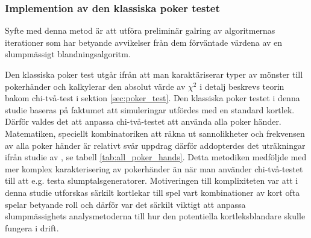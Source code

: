 \documentclass[swedish,a4paper]{article}
\begin{document}






\subsubsection{Implemention av den klassiska poker testet}
Syfte med denna metod är att utföra preliminär galring av algoritmernas
iterationer som har betyande avvikelser från dem förväntade värdena av en slumpmässigt
blandningsalgoritm.  

Den klassiska poker test utgår ifrån att man karaktäriserar typer av mönster
till pokerhänder och kalkylerar  den absolut värde av $\chi^2$ i detalj beskrevs
teorin bakom chi-två-test  i sektion \ref{sec:poker_test}. Den klassiska poker
testet i denna studie baseras på faktumet att simuleringar utfördes med en
standard kortlek. Därför valdes det att anpassa chi-två-testet att använda alla
poker händer. Matematiken, speciellt kombinatoriken att räkna ut sannolikheter
och frekvensen av alla poker\- händer är relativt svår uppdrag därför
addopterdes det uträkningar ifrån studie av \textcite{Drew2006}, se tabell
\ref{tab:all_poker_hands}. Detta metodiken medföljde med mer komplex
karakterisering av poker\-händer än när man använder chi-två-testet till att
e.g. testa slumptalsgeneratorer. Motiveringen till komplixiteten var att i denna
studie utforskas särkilt kortlekar till spel vart kombinationer av kort ofta
spelar betyande roll och därför var det särkilt viktigt att anpassa
slumpmässighets analysmetoderna till hur den potentiella kortleksblandare skulle
fungera i drift.
\end{document}
